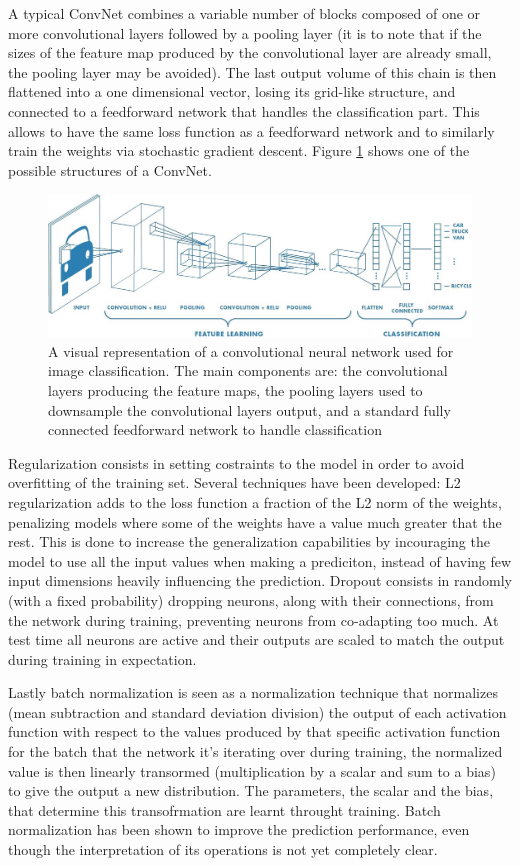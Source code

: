 \documentclass[12pt]{article}
\begin{document}
A typical ConvNet combines a variable number of blocks composed of one or more convolutional layers followed by a pooling layer (it is to note that if the sizes of the feature map produced by the convolutional layer are already small, the pooling layer may be avoided). The last output volume of this chain is then flattened into a one dimensional vector, losing its grid-like structure, and connected to a feedforward network that handles the classification part. This allows to have the same loss function as a feedforward network and to similarly train the weights via stochastic gradient descent. Figure \ref{fig:cnn} shows one of the possible structures of a ConvNet. 

\begin{figure}[h]
	\centering
	\includegraphics[width=\textwidth]{cnn}
	\caption{A visual representation of a convolutional neural network used for image classification. The main components are: the convolutional layers producing the feature maps, the pooling layers used to downsample the convolutional layers output, and a standard fully connected feedforward network to handle classification}
	\label{fig:cnn}
\end{figure}

Regularization consists in setting costraints to the model in order to avoid overfitting of the training set. Several techniques have been developed: L2 regularization adds to the loss function a fraction of the L2 norm of the weights, penalizing models where some of the weights have a value much greater that the rest. This is done to increase the generalization capabilities by incouraging the model to use all the input values when making a prediciton, instead of having few input dimensions heavily influencing the prediction.
Dropout	consists in randomly (with a fixed probability) dropping neurons, along with their connections, from the network during training, preventing neurons from co-adapting too much. At test time all neurons are active and their outputs are scaled to match the output during training in expectation.

Lastly batch normalization is seen as a normalization technique that normalizes (mean subtraction and standard deviation division) the output of each activation function with respect to the values produced by that specific activation function for the batch that the network it's iterating over during training, the normalized value is then linearly transormed (multiplication by a scalar and sum to a bias) to give the output a new distribution. The parameters, the scalar and the bias, that determine this transofrmation are learnt throught training. Batch normalization has been shown to improve the prediction performance, even though the interpretation of its operations is not yet completely clear.
\end{document}

